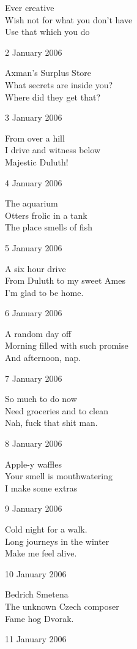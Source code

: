 \documentclass[12pt]{article}
\begin{document}
Ever creative \\
Wish not for what you don't have \\
Use that which you do

\newpage

2 January 2006

Axman's Surplus Store \\
What secrets are inside you? \\
Where did they get that? 

3 January 2006

From over a hill \\
I drive and witness below \\
Majestic Duluth! 

4 January 2006

The aquarium \\
Otters frolic in a tank \\
The place smells of fish

5 January 2006

A six hour drive \\
From Duluth to my sweet Ames \\
I'm glad to be home. 

6 January 2006

A random day off \\
Morning filled with such promise \\
And afternoon, nap.

7 January 2006

So much to do now \\
Need groceries and to clean \\
Nah, fuck that shit man.


\newpage

8 January 2006

Apple-y waffles \\
Your smell is mouthwatering \\
I make some extras

9 January 2006

Cold night for a walk. \\
Long journeys in the winter \\
Make me feel alive.

10 January 2006

Bedrich Smetena \\
The unknown Czech composer \\
Fame hog Dvorak. 

11 January 2006
\end{document}
